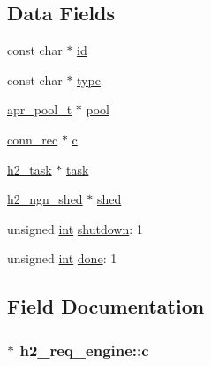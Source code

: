 \subsection*{Data Fields}
\begin{DoxyCompactItemize}
\item 
const char $\ast$ \hyperlink{structh2__req__engine_a00b19b07dd301e0e3d0b4970070a4b3c}{id}
\item 
const char $\ast$ \hyperlink{structh2__req__engine_aff1ecf309446554dfc0d1f5a83a3906c}{type}
\item 
\hyperlink{structapr__pool__t}{apr\+\_\+pool\+\_\+t} $\ast$ \hyperlink{structh2__req__engine_a9df60573028fc93ee3802ce879aa2d17}{pool}
\item 
\hyperlink{structconn__rec}{conn\+\_\+rec} $\ast$ \hyperlink{structh2__req__engine_a13758af1a2bbf5551ce2b9c9072b623b}{c}
\item 
\hyperlink{structh2__task}{h2\+\_\+task} $\ast$ \hyperlink{structh2__req__engine_ad4cb93af13328ad6a87f083545d1e990}{task}
\item 
\hyperlink{structh2__ngn__shed}{h2\+\_\+ngn\+\_\+shed} $\ast$ \hyperlink{structh2__req__engine_a83b172305c7d44670cda27f2dd742a66}{shed}
\item 
unsigned \hyperlink{pcre_8txt_a42dfa4ff673c82d8efe7144098fbc198}{int} \hyperlink{structh2__req__engine_a299d9d2ee463ed04588b9c3112a69e79}{shutdown}\+: 1
\item 
unsigned \hyperlink{pcre_8txt_a42dfa4ff673c82d8efe7144098fbc198}{int} \hyperlink{structh2__req__engine_a101d67c6f32892e8cb93114290901372}{done}\+: 1
\end{DoxyCompactItemize}


\subsection{Field Documentation}
\subsubsection[{\texorpdfstring{c}{c}}]{$\ast$ h2\+\_\+req\+\_\+engine\+::c}\hypertarget{structh2__req__engine_a13758af1a2bbf5551ce2b9c9072b623b}{}\label{structh2__req__engine_a13758af1a2bbf5551ce2b9c9072b623b}
